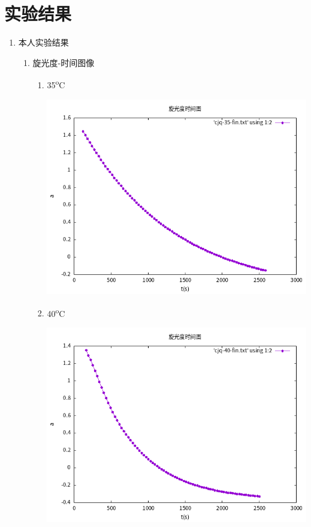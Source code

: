 \documentclass[11pt]{report}
\begin{document}
\section{实验结果}
\label{sec:orgc94c449}
\begin{enumerate}
\item 本人实验结果
\label{sec:org7ec2fc7}
\begin{enumerate}
\item 旋光度-时间图像
\label{sec:org35210d2}
\begin{enumerate}
\item 35\textsuperscript{o}C
\label{sec:org9d1fe47}
\begin{center}
\includegraphics[width=.9\linewidth]{../data/cjq-35.png}
\end{center}
\item 40\textsuperscript{o}C
\label{sec:orgdf4b667}
\begin{center}
\includegraphics[width=.9\linewidth]{../data/cjq-40.png}

\end{center}
\end{enumerate}
\end{enumerate}
\end{enumerate}
\end{document}

